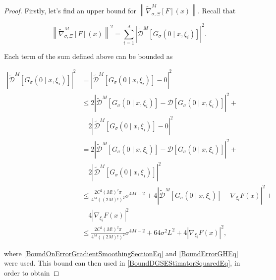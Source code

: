 \begin{proof}

Firstly, let's find an upper bound for $\left\|\widetilde{\nabla}_{\sigma, \Xi}^{M}[F](x)\right\|$. Recall that

\begin{equation}\label{BoundDGSEStimatorSquaredEq}
\left\|\widetilde{\nabla}_{\sigma, \Xi}^{M}[F](x)\right\|^{2} = \sum_{i=1}^d \left|\widetilde{\mathcal{D}}^{M}\left[G_{\sigma}\left(0 \mid x, \xi_{i}\right)\right]\right|^{2}.
\end{equation}

Each term of the sum defined above can be bounded as

\begin{equation}\label{BoundOnErrorEstimationGradientSmoothingSectionEq2}
 \begin{aligned}
 \left|\widetilde{\mathcal{D}}^{M}\left[G_{\sigma}\left(0 \mid x, \xi_{i}\right)\right]\right|^{2} 
 & =  \left|\widetilde{\mathcal{D}}^{M}\left[G_{\sigma}\left(0 \mid x, \xi_{i}\right)\right] - 0 \right|^{2} \\
 & \leq  2\left|\widetilde{\mathcal{D}}^{M}\left[G_{\sigma}\left(0 \mid x, \xi_{i}\right)\right] - \mathcal{D}\left[G_{\sigma}\left(0 \mid x, \xi_{i}\right)\right] \right|^{2} + \\ & \quad 2\left|\widetilde{\mathcal{D}}^{M}\left[G_{\sigma}\left(0 \mid x, \xi_{i}\right)\right] - 0 \right|^{2} \\
 & = 2\left|\widetilde{\mathcal{D}}^{M}\left[G_{\sigma}\left(0 \mid x, \xi_{i}\right)\right] - \mathcal{D}\left[G_{\sigma}\left(0 \mid x, \xi_{i}\right)\right] \right|^{2} + \\ & \quad 2\left|\widetilde{\mathcal{D}}^{M}\left[G_{\sigma}\left(0 \mid x, \xi_{i}\right)\right] \right|^{2} \\
 & \leq \frac{2 C^{2}(M !)^{2} \pi}{4^{M}((2 M) !)^{2}} \sigma^{4 M-2} + 4\left|\widetilde{\mathcal{D}}^{M}\left[G_{\sigma}\left(0 \mid x, \xi_{i}\right)\right] - \nabla_{\xi_{i}} F(x) \right|^{2} + \\ & \quad 4\left|\nabla_{\xi_{i}} F(x)\right|^{2} \\
 & \leq \frac{2 C^{2}(M !)^{2} \pi}{4^{M}((2 M) !)^{2}} \sigma^{4 M-2} + 64\sigma^2 L^2 + 4\left|\nabla_{\xi_{i}} F(x)\right|^{2},
 \end{aligned} 
\end{equation}

where \ref{BoundOnErrorGradientSmoothingSectionEq} and \ref{BoundErrorGHEq} were used. This bound can then used in \ref{BoundDGSEStimatorSquaredEq}, in order to obtain


\end{proof}

